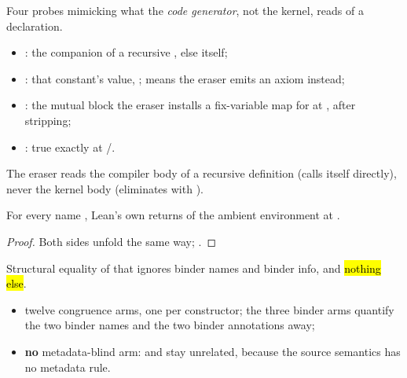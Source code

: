\begin{definition}\label{def:Witness-compilerInfo}
 \leanok
{} Four probes mimicking what the \emph{code generator}, not the kernel, reads of a
declaration.
\begin{itemize}
\item {}: the  companion of a recursive , else
 itself;
\item {}: that constant's value, ;  means the
eraser emits an axiom instead;
\item {}: the mutual block the eraser installs a fix-variable map for at
, after  stripping;
\item {}: true exactly at /.
\end{itemize}
 The eraser reads the compiler body of a recursive definition (calls itself directly),
never the kernel body (eliminates with ).
\end{definition}

\begin{lemma}\label{lem:Witness-compilerInfo-eq}
 \leanok
{}
For every name , Lean's own  returns 
of the ambient environment at .
\end{lemma}

\begin{proof} \leanok
{}
 Both sides unfold  the same way; .
\end{proof}

\begin{definition}\label{def:Witness-Expr-AlphaEq}
 \leanok
{} Structural equality of  that ignores binder names and binder info,
and \hl{nothing else}.
\begin{itemize}
\item twelve congruence arms, one per  constructor; the three binder arms
quantify the two binder names and the two binder annotations away;
\item \textbf{no} metadata-blind arm:  and  stay unrelated, because the
source semantics has no metadata rule.
\end{itemize}
\end{definition}

